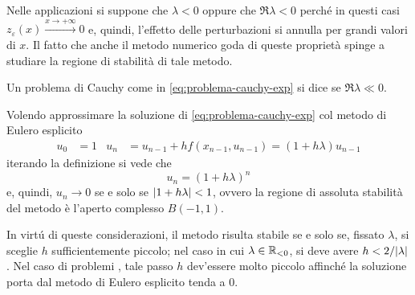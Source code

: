 	Nelle applicazioni si suppone che \(\lambda < 0\) oppure che \(\Re \lambda < 0\) perché in questi casi \(z_\varepsilon (x) \xrightarrow{x \to + \infty} 0\) e, quindi, l'effetto delle perturbazioni si annulla per grandi valori di \(x\). Il fatto che anche il metodo numerico goda di queste proprietà spinge a studiare la regione di stabilità di tale metodo.
	
	\begin{definizione}
		Un problema di Cauchy come in \eqref{eq:problema-cauchy-exp} si dice  se \(\Re \lambda \ll 0\).
	\end{definizione}

	\begin{esempio}
		Volendo approssimare la soluzione di \eqref{eq:problema-cauchy-exp} col metodo di Eulero esplicito
		\begin{align*}
			u_0 &= 1 &
			u_n &= u_{n - 1} + h f (x_{n - 1}, u_{n - 1}) = (1 + h \lambda) u_{n - 1}
		\end{align*}
		iterando la definizione si vede che
		\begin{equation*}
			u_n = (1 + h \lambda)^n
		\end{equation*}
		e, quindi, \(u_n \to 0\) se e solo se \(\abs{1 + h \lambda} < 1\), ovvero la regione di assoluta stabilità del metodo è l'aperto complesso \(B (-1, 1)\).
		
		In virtú di queste considerazioni, il metodo risulta stabile se e solo se, fissato \(\lambda\), si sceglie \(h\) sufficientemente piccolo; nel caso in cui \(\lambda \in \mathbb{R}_{< 0}\), si deve avere \(h < 2 / \abs{\lambda}\). Nel caso di problemi , tale passo \(h\) dev'essere molto piccolo affinché la soluzione porta dal metodo di Eulero esplicito tenda a \(0\).
	\end{esempio}
	
